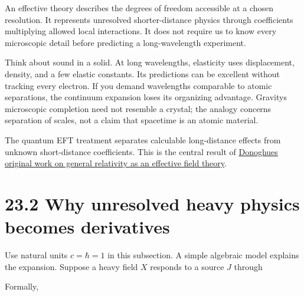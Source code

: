 \documentclass[
  11pt,
  letterpaper,
  oneside,
  openany]{scrbook}
\begin{document}
An effective theory describes the degrees of freedom accessible at a
chosen resolution. It represents unresolved shorter-distance physics
through coefficients multiplying allowed local interactions. It does not
require us to know every microscopic detail before predicting a
long-wavelength experiment.

Think about sound in a solid. At long wavelengths, elasticity uses
displacement, density, and a few elastic constants. Its predictions can
be excellent without tracking every electron. If you demand wavelengths
comparable to atomic separations, the continuum expansion loses its
organizing advantage. Gravity\textquotesingle s microscopic completion
need not resemble a crystal; the analogy concerns separation of scales,
not a claim that spacetime is an atomic material.

The quantum EFT treatment separates calculable long-distance effects
from unknown short-distance coefficients. This is the central result of
\href{https://arxiv.org/abs/gr-qc/9405057}{Donoghue\textquotesingle s
original work on general relativity as an effective field theory}.

\hypertarget{why-unresolved-heavy-physics-becomes-derivatives}{%
\section{23.2 Why unresolved heavy physics becomes
derivatives}\label{why-unresolved-heavy-physics-becomes-derivatives}}

Use natural units \(c=\hbar=1\) in this subsection. A simple algebraic
model explains the expansion. Suppose a heavy field \(X\) responds to a
source \(J\) through

\begin{center}
\begingroup
{}
\ifdim\wd\grmathbox>\linewidth
\resizebox{\linewidth}{!}{\usebox{\grmathbox}}
\else\usebox{\grmathbox}\fi
\endgroup
\end{center}

Formally,

\begin{center}
\begingroup
{}
\ifdim\wd\grmathbox>\linewidth
\resizebox{\linewidth}{!}{\usebox{\grmathbox}}
\else\usebox{\grmathbox}\fi
\endgroup
\end{center}
\end{document}
